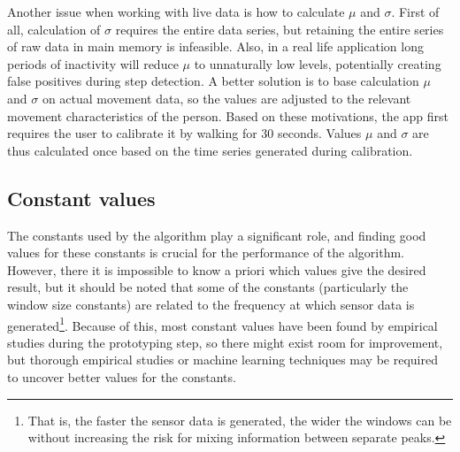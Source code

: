 Another issue when working with live data is how to calculate $\mu$ and $\sigma$. First of all, calculation of $\sigma$ requires the entire data series, but retaining the entire series of raw data in main memory is infeasible. Also, in a real life application long periods of inactivity will reduce $\mu$ to unnaturally low levels, potentially creating false positives during step detection. A better solution is to base calculation $\mu$ and $\sigma$ on actual movement data, so the values are adjusted to the relevant movement characteristics of the person. Based on these motivations, the app first requires the user to calibrate it by walking for 30 seconds. Values $\mu$ and $\sigma$ are thus calculated once based on the time series generated during calibration. 

\subsection{Constant values}
The constants used by the algorithm play a significant role, and finding good values for these constants is crucial for the performance of the algorithm. However, there it is impossible to know a priori which values give the desired result, but it should be noted that some of the constants (particularly the window size constants) are related to the frequency at which sensor data is generated\footnote{That is, the faster the sensor data is generated, the wider the windows can be without increasing the risk for mixing information between separate peaks.}. Because of this, most constant values have been found by empirical studies during the prototyping step, so there might exist room for improvement, but thorough empirical studies or machine learning techniques may be required to uncover better values for the constants.